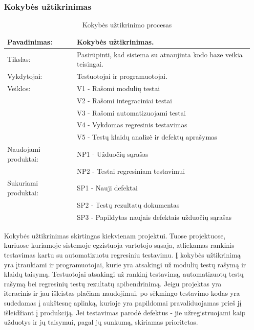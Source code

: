 \documentclass{VUMIFPSkursinis}
\begin{document}
	\subsubsection{Kokybės užtikrinimas}
	\begin{center}
		\begin{table}[ht]
		\caption{Kokybės užtikrinimo procesas}
		\begin{tabular}{ | l | l | } 
		\hline
		Pavadinimas:         & Kokybės užtikrinimas.                                       \\ \hline
		Tikslas: 	           & Pasirūpinti, kad sistema su atnaujinta kodo baze veikia teisingai. \\ \hline
		Vykdytojai:          & Testuotojai ir programuotojai.                                \\ \hline
		Veiklos:               & V1 - Rašomi modulių testai \\
		  & V2 - Rašomi integraciniai testai \\
		    & V3 - Rašomi automatizuojami testai													\\	
			& V4 - Vykdomas regresinis testavimas										\\
						             & V5 - Testų klaidų analizė ir defektų aprašymas 								 \\ \hline
		Naudojami produktai: & NP1 - Užduočių sąrašas 																				\\
												 & NP2 - Testai regresiniam testavimui																												 \\ \hline
		Sukuriami produktai: & SP1 - Nauji defektai																							\\
												 & SP2 - Testų rezultatų dokumentas 																	 \\
												 & SP3 - Papildytas naujais defektais užduočių sąrašas															\\ \hline
		\end{tabular}
	\end{table}
		\end{center}
	Kokybės užtikrinimas skirtingas kiekvienam projektui. Tuose projektuose, kuriuose kuriamoje sistemoje egzistuoja vartotojo sąsaja, atliekamas rankinis testavimas kartu su automatizuotu regresiniu testavimu. Į kokybės užtikrinimą yra įtraukiami ir programuotojai, kurie yra atsakingi už modulių testų rašymą ir klaidų taisymą. Testuotojai atsakingi už rankinį testavimą, automatizuotų testų rašymą bei regresinių testų rezultatų apibendrinimą. Jeigu projektas yra iteracinis ir jau išleistas plačiam naudojimui, po sėkmingo testavimo kodas yra sudedamas į aukštesnę aplinką, kurioje yra papildomai pravaliduojamas prieš jį išleidžiant į produkciją. Jei testavimas parodė defektus - jie užregistruojami kaip užduotys ir jų taisymui, pagal jų sunkumą, skiriamas prioritetas. 
\end{document}
